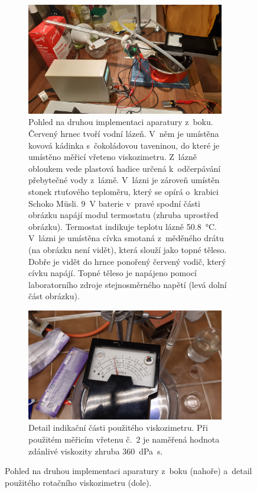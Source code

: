 \documentclass[12pt]{article}
\begin{document}
\begin{figure}
    \begin{subfigure}[t]{\textwidth}
        \centering
        \includegraphics[width = 0.95\textwidth]{prilohy/aparatura_bok.jpg}
        \caption{Pohled na druhou implementaci aparatury z~boku. Červený hrnec tvoří vodní lázeň. V~něm je umístěna kovová kádinka s~čokoládovou taveninou, do které je umístěno měřicí vřeteno viskozimetru. Z~lázně obloukem vede plastová hadice určená k~odčerpávání přebytečné vody z~lázně. V~lázni je zároveň umístěn stonek rtuťového teploměru, který se opírá o~krabici Schoko Müsli. \SI{9}{\volt} baterie v~pravé spodní části obrázku napájí modul termostatu (zhruba uprostřed obrázku). Termostat indikuje teplotu lázně \SI{50,8}{\degreeCelsius}. V~lázni je umístěna cívka smotaná z~měděného drátu (na obrázku není vidět), která slouží jako topné těleso. Dobře je vidět do hrnce ponořený červený vodič, který cívku napájí. Topné těleso je napájeno pomocí laboratorního zdroje stejnosměrného napětí (levá dolní část obrázku).}
        \label{fig:aparatura_bok}
    \end{subfigure}
    \hfill
    \begin{subfigure}[t]{\textwidth}
        \centering
        \includegraphics[width = 0.95\textwidth]{prilohy/viskozimetr_1.jpg}
        \caption{Detail indikační části použitého viskozimetru. Při použitém měřicím vřetenu č.~2 je naměřená hodnota zdánlivé viskozity zhruba \SI{360}{\deci\pascal\second}.}
    \end{subfigure}
    \caption{Pohled na druhou implementaci aparatury z~boku (nahoře) a~detail použitého rotačního viskozimetru (dole).}
\end{figure}
\end{document}
